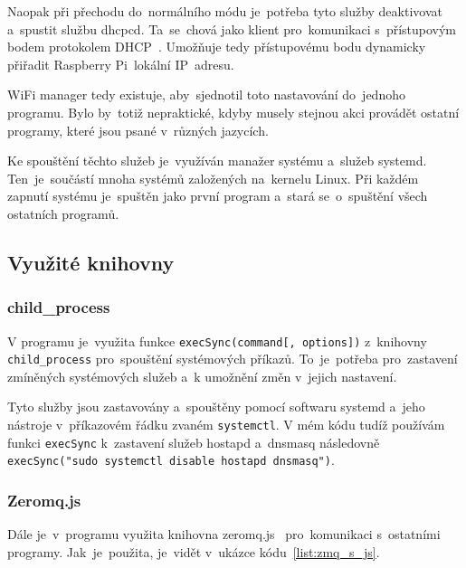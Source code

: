 Naopak při přechodu do~normálního  módu je~potřeba tyto služby deaktivovat a~spustit službu dhcpcd. Ta~se~chová jako klient pro~komunikaci s~přístupovým bodem protokolem DHCP~\cite{dhcpcd}. Umožňuje tedy přístupovému bodu dynamicky přiřadit Raspberry Pi~lokální IP~adresu.

WiFi manager tedy existuje, aby~sjednotil toto nastavování do~jednoho programu. Bylo by~totiž nepraktické, kdyby musely stejnou akci provádět ostatní programy, které jsou psané v~různých jazycích.

Ke spouštění těchto služeb je~využíván manažer systému a~služeb systemd. Ten~je~součástí mnoha systémů založených na~kernelu Linux. Při každém zapnutí systému je~spuštěn jako první program a~stará se~o~spuštění všech ostatních programů.~\cite{systemd}

\subsection{Využité knihovny}
\subsubsection{child\_process}
V programu je~využita funkce \texttt{execSync(command[, options])} z~knihovny \texttt{child_process} pro~spouštění systémových příkazů. To~je~potřeba pro~zastavení zmíněných systémových služeb a~k umožnění změn v~jejich nastavení.

Tyto služby jsou zastavovány a~spouštěny pomocí softwaru systemd a~jeho nástroje v~příkazovém řádku zvaném \texttt{systemctl}.
V mém kódu tudíž používám funkci \texttt{execSync} k~zastavení služeb hostapd a~dnsmasq následovně \texttt{execSync("sudo systemctl disable hostapd dnsmasq")}.

\subsubsection{Zeromq.js}
Dále je~v~programu využita knihovna zeromq.js~\cite{zeromqjs} pro~komunikaci s~ostatními programy. Jak~je~použita, je~vidět v~ukázce kódu~\ref{list:zmq_s_js}.

\begin{code}
  \inputminted[frame=lines,fontsize=\footnotesize{}, linenos, breaklines]{js}{code_examples/zmq_server.js}
\end{code}

